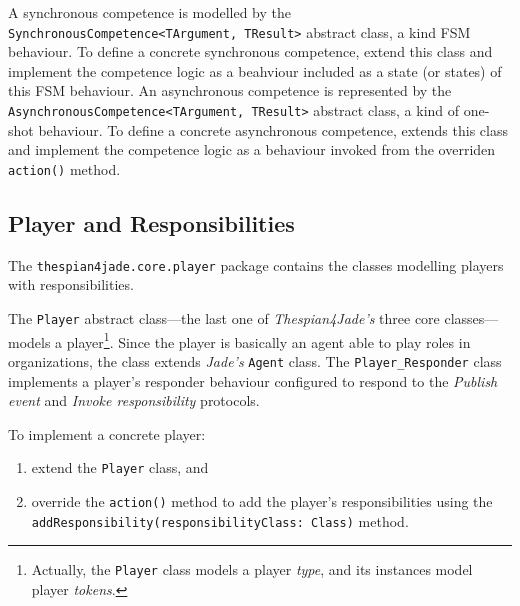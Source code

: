 A synchronous competence is modelled by the \texttt{SynchronousCompetence<TArgument, TResult>} abstract class, a kind FSM behaviour.
To define a concrete synchronous competence, extend this class and implement the competence logic as a beahviour included as a state (or states) of this FSM behaviour.
An asynchronous competence is represented by the \texttt{AsynchronousCompetence<TArgument, TResult>} abstract class, a kind of one-shot behaviour.
To define a concrete asynchronous competence, extends this class and implement the competence logic as a behaviour invoked from the overriden \texttt{action()} method.

\subsection{Player and Responsibilities}

The \texttt{thespian4jade.core.player} package contains the classes modelling players with responsibilities.

The \texttt{Player} abstract class---the last one of \textit{Thespian4Jade's} three core classes---models a player\footnote{Actually, the \texttt{Player} class models a player \textit{type}, and its instances model player \textit{tokens}.}.
Since the player is basically an agent able to play roles in organizations, the class extends \textit{Jade's} \texttt{Agent} class.
The \texttt{Player\_Responder} class implements a player's responder behaviour configured to respond to the \textit{Publish event} and \textit{Invoke responsibility} protocols.

To implement a concrete player:
\begin{enumerate}
	\item extend the \texttt{Player} class, and
	\item override the \texttt{action()} method to add the player's responsibilities using the \texttt{addResponsibility(responsibilityClass: Class)} method.	
\end{enumerate}

